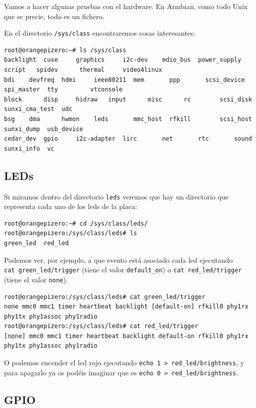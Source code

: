 \documentclass[12pt,spanish,]{scrartcl}
\begin{document}
Vamos a hacer algunas pruebas con el hardware. En Armbian, como todo
Unix que se precie, todo es un fichero.

En el directorio \texttt{/sys/class} encontraremos cosas interesantes:

\begin{verbatim}
root@orangepizero:~# ls /sys/class
backlight  cuse     graphics     i2c-dev    mdio_bus  power_supply  script   spidev      thermal     video4linux
bdi    devfreq  hdmi     ieee80211  mem       ppp       scsi_device  spi_master  tty         vtconsole
block      disp     hidraw   input      misc      rc        scsi_disk    sunxi_cma_test  udc
bsg    dma      hwmon    leds       mmc_host  rfkill        scsi_host    sunxi_dump  usb_device
cedar_dev  gpio     i2c-adapter  lirc       net       rtc       sound    sunxi_info  vc
\end{verbatim}

\subsection{LEDs}\label{leds}

Si miramos dentro del directorio \texttt{leds} veremos que hay un
directorio que representa cada uno de los leds de la placa:

\begin{verbatim}
root@orangepizero:~# cd /sys/class/leds/
root@orangepizero:/sys/class/leds# ls
green_led  red_led
\end{verbatim}

Podemos ver, por ejemplo, a que evento está asociado cada led ejecutando
\texttt{cat\ green\_led/trigger} (tiene el valor \texttt{default\_on}) o
\texttt{cat\ red\_led/trigger} (tiene el valor \texttt{none}).

\begin{verbatim}
root@orangepizero:/sys/class/leds# cat green_led/trigger 
none mmc0 mmc1 timer heartbeat backlight [default-on] rfkill0 phy1rx phy1tx phy1assoc phy1radio 
root@orangepizero:/sys/class/leds# cat red_led/trigger 
[none] mmc0 mmc1 timer heartbeat backlight default-on rfkill0 phy1rx phy1tx phy1assoc phy1radio 
\end{verbatim}

O podemos encender el led rojo ejecutando
\texttt{echo\ 1\ \textgreater{}\ red\_led/brightness}, y para apagarlo
ya os podéis imaginar que es
\texttt{echo\ 0\ \textgreater{}\ red\_led/brightness}.

\subsection{GPIO}\label{gpio}
\end{document}
